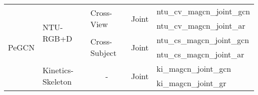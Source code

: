 \documentclass[runningheads]{llncs}
\begin{document}
\begin{table}[h]
{\begin{tabular}{|l|l|l|l|l|}
\multirow{6}{*}{PeGCN} 
                         & \multirow{4}{*}{NTU-RGB+D}         & \multirow{2}{*}{Cross-View}                &  \multirow{2}{*}{Joint} &ntu\_cv\_magcn\_joint\_gcn\\ \cline{5-5} 
                         &                                    &                                            &       &ntu\_cv\_magcn\_joint\_ar\\ \cline{3-5} 
                         &                                    & \multirow{2}{*}{Cross-Subject}             & \multirow{2}{*}{Joint}  &ntu\_cs\_magcn\_joint\_gcn\\ \cline{5-5} 
                         &                                    &                                            &       &ntu\_cs\_magcn\_joint\_ar\\ \cline{2-5} 
                         & \multirow{2}{*}{Kinetics-Skeleton} & \multicolumn{1}{c|}{\multirow{2}{*}{-}}    & \multirow{2}{*}{Joint}  &ki\_magcn\_joint\_gcn\\  \cline{5-5}
                         &                                    &  \multicolumn{1}{c|}{}                     &       &ki\_magcn\_joint\_gr\\ \hline
        
\end{tabular}
}\vspace{0.5ex}
\label{tbl:weights}
\end{table}









\newpage
\end{document}
